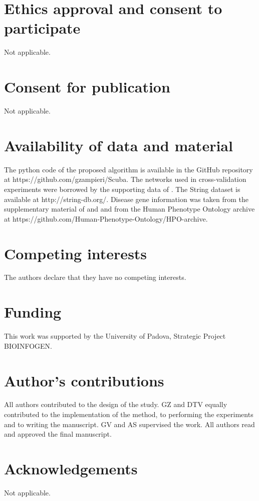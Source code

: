 \documentclass[twocolumn]{bmcart}%
\begin{document}
\begin{backmatter}
\section*{Ethics approval and consent to participate}
  Not applicable.

\section*{Consent for publication}
  Not applicable.

\section*{Availability of data and material}
  The python code of the proposed algorithm is available in the GitHub repository at https://github.com/gzampieri/Scuba. The networks used in cross-validation experiments were borrowed by the supporting data of \cite{f3pc}. The String dataset is available at http://string-db.org/. Disease gene information was taken from the supplementary material of \cite{bornigen} and \cite{goh} and from the Human Phenotype Ontology archive at https://github.com/Human-Phenotype-Ontology/HPO-archive.

\section*{Competing interests}
  The authors declare that they have no competing interests.

\section*{Funding}
  This work was supported by the University of Padova, Strategic Project BIOINFOGEN.

\section*{Author's contributions}
  All authors contributed to the design of the study. GZ and DTV equally contributed to the implementation of the method, to performing the experiments and to writing the manuscript. GV and AS supervised the work. All authors read and approved the final manuscript.

\section*{Acknowledgements}
  Not applicable.


\end{backmatter}
\end{document}
